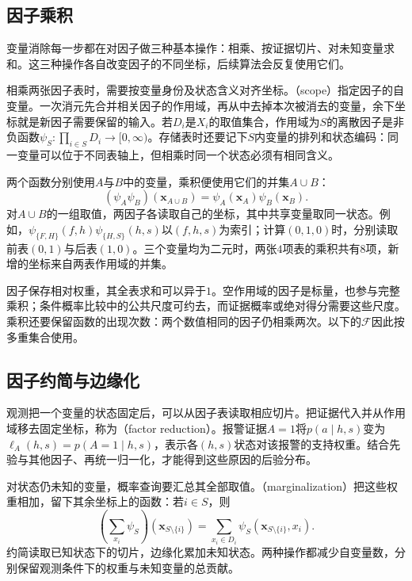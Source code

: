 \subsection{因子乘积}
\label{sec:pgm-elimination-factor-product}

变量消除每一步都在对因子做三种基本操作：相乘、按证据切片、对未知变量求和。这三种操作各自改变因子的不同坐标，后续算法会反复使用它们。

相乘两张因子表时，需要按变量身份及状态含义对齐坐标。（scope）指定因子的自变量。一次消元先合并相关因子的作用域，再从中去掉本次被消去的变量，余下坐标就是新因子需要保留的输入。若$D_i$是$X_i$的取值集合，作用域为$S$的离散因子是非负函数$\psi_S:\prod_{i\in S}D_i\to[0,\infty)$。存储表时还要记下$S$内变量的排列和状态编码：同一变量可以位于不同表轴上，但相乘时同一个状态必须有相同含义。

两个函数分别使用$A$与$B$中的变量，乘积便使用它们的并集$A\cup B$：
\begin{equation}
  (\psi_A\psi_B)(\bm{x}_{A\cup B})
  =\psi_A(\bm{x}_A)\psi_B(\bm{x}_B).
  \label{eq:pgm-elimination-product}
\end{equation}
对$A\cup B$的一组取值，两因子各读取自己的坐标，其中共享变量取同一状态。例如，$\psi_{\{F,H\}}(f,h)\psi_{\{H,S\}}(h,s)$以$(f,h,s)$为索引；计算$(0,1,0)$时，分别读取前表$(0,1)$与后表$(1,0)$。三个变量均为二元时，两张$4$项表的乘积共有$8$项，新增的坐标来自两表作用域的并集。

因子保存相对权重，其全表求和可以异于$1$。空作用域的因子是标量，也参与完整乘积；条件概率比较中的公共尺度可约去，而证据概率或绝对得分需要这些尺度。乘积还要保留函数的出现次数：两个数值相同的因子仍相乘两次。以下的$\mathcal{F}$因此按多重集合使用。

\subsection{因子约简与边缘化}
\label{sec:pgm-elimination-reduction-marginalization}

观测把一个变量的状态固定后，可以从因子表读取相应切片。把证据代入并从作用域移去固定坐标，称为（factor reduction）。报警证据$A=1$将$p(a\mid h,s)$变为$\ell_A(h,s)=p(A=1\mid h,s)$，表示各$(h,s)$状态对该报警的支持权重。结合先验与其他因子、再统一归一化，才能得到这些原因的后验分布。

对状态仍未知的变量，概率查询要汇总其全部取值。（marginalization）把这些权重相加，留下其余坐标上的函数：若$i\in S$，则
\begin{equation}
  (\mathop{\textstyle\sum}_{x_i}\psi_S)
    (\bm{x}_{S\setminus\{i\}})
  =\sum_{x_i\in D_i}\psi_S(\bm{x}_{S\setminus\{i\}},x_i).
  \label{eq:pgm-elimination-factor-marginal}
\end{equation}
约简读取已知状态下的切片，边缘化累加未知状态。两种操作都减少自变量数，分别保留观测条件下的权重与未知变量的总贡献。

